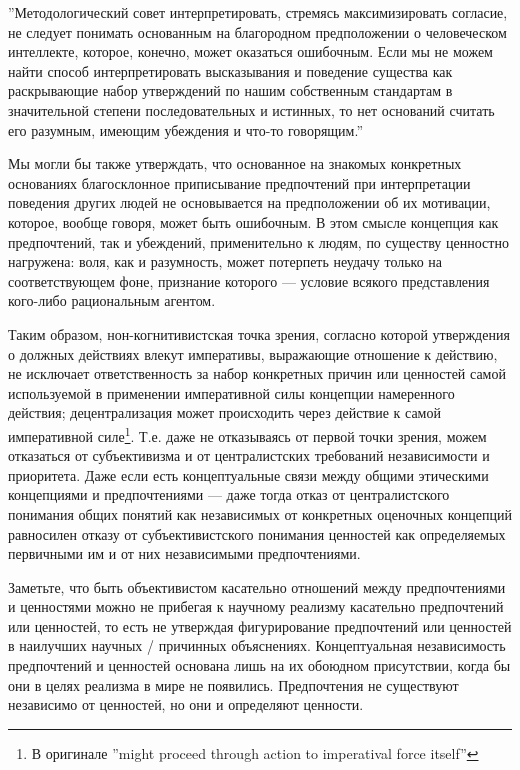 \documentclass[11pt]{book}
\begin{document}
\smallskip

''Методологический совет интерпретировать, стремясь максимизировать согласие, не следует понимать основанным на благородном предположении о человеческом интеллекте, которое, конечно, может оказаться ошибочным. Если мы не можем найти способ интерпретировать высказывания и поведение существа как раскрывающие набор утверждений по нашим собственным стандартам в значительной степени последовательных и истинных, то нет оснований считать его разумным, имеющим убеждения и что-то говорящим.''

\smallskip

Мы могли бы также утверждать, что основанное на знакомых конкретных основаниях благосклонное приписывание предпочтений при интерпретации поведения других людей не основывается на предположении об их мотивации, которое, вообще говоря, может быть ошибочным. В этом смысле концепция как предпочтений, так и убеждений, применительно к людям, по существу ценностно нагружена: воля, как и разумность, может потерпеть неудачу только на соответствующем фоне, признание которого --- условие всякого представления кого-либо рациональным агентом.

Таким образом, нон-когнитивистская точка зрения, согласно которой утверждения о должных действиях влекут императивы, выражающие отношение к действию, не исключает ответственность за набор конкретных причин или ценностей самой используемой в применении императивной силы концепции намеренного действия; децентрализация может происходить через действие к самой императивной силе\footnote{В оригинале ''might proceed through action to imperatival force itself''}. Т.е. даже не отказываясь от первой точки зрения, можем отказаться от субъективизма и от централистских требований независимости и приоритета. Даже если есть концептуальные связи между общими этическими концепциями и предпочтениями --- даже тогда отказ от централистского понимания общих понятий как независимых от конкретных оценочных концепций равносилен отказу от субъективистского понимания ценностей как определяемых первичными им и от них независимыми предпочтениями.

Заметьте, что быть объективистом касательно отношений между предпочтениями и ценностями можно не прибегая к научному реализму касательно предпочтений или ценностей, то есть не утверждая фигурирование предпочтений или ценностей в наилучших научных / причинных объяснениях. Концептуальная независимость предпочтений и ценностей основана лишь на их обоюдном присутствии, когда бы они в целях реализма в мире не появились. Предпочтения не существуют независимо от ценностей, но они и определяют ценности.
\end{document}
